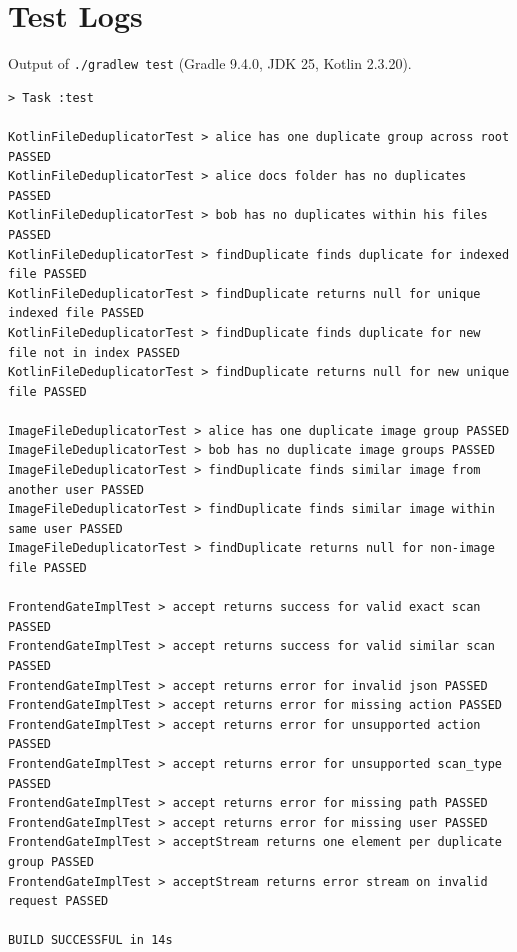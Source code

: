 \section{Test Logs}
\label{app:testlogs}

Output of \texttt{./gradlew test} (Gradle 9.4.0, JDK 25, Kotlin 2.3.20).

\begin{lstlisting}[language={}]
> Task :test

KotlinFileDeduplicatorTest > alice has one duplicate group across root PASSED
KotlinFileDeduplicatorTest > alice docs folder has no duplicates PASSED
KotlinFileDeduplicatorTest > bob has no duplicates within his files PASSED
KotlinFileDeduplicatorTest > findDuplicate finds duplicate for indexed file PASSED
KotlinFileDeduplicatorTest > findDuplicate returns null for unique indexed file PASSED
KotlinFileDeduplicatorTest > findDuplicate finds duplicate for new file not in index PASSED
KotlinFileDeduplicatorTest > findDuplicate returns null for new unique file PASSED

ImageFileDeduplicatorTest > alice has one duplicate image group PASSED
ImageFileDeduplicatorTest > bob has no duplicate image groups PASSED
ImageFileDeduplicatorTest > findDuplicate finds similar image from another user PASSED
ImageFileDeduplicatorTest > findDuplicate finds similar image within same user PASSED
ImageFileDeduplicatorTest > findDuplicate returns null for non-image file PASSED

FrontendGateImplTest > accept returns success for valid exact scan PASSED
FrontendGateImplTest > accept returns success for valid similar scan PASSED
FrontendGateImplTest > accept returns error for invalid json PASSED
FrontendGateImplTest > accept returns error for missing action PASSED
FrontendGateImplTest > accept returns error for unsupported action PASSED
FrontendGateImplTest > accept returns error for unsupported scan_type PASSED
FrontendGateImplTest > accept returns error for missing path PASSED
FrontendGateImplTest > accept returns error for missing user PASSED
FrontendGateImplTest > acceptStream returns one element per duplicate group PASSED
FrontendGateImplTest > acceptStream returns error stream on invalid request PASSED

BUILD SUCCESSFUL in 14s
\end{lstlisting}
